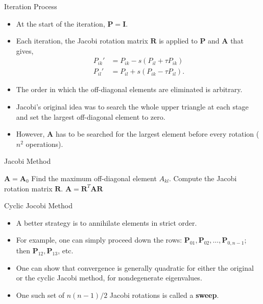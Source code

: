\documentclass{beamer}
\begin{document}
\begin{frame}{Iteration Process}
    \begin{itemize}
        \item At the start of the iteration, $\mathbf{P}=\mathbf{I}$. 
        \item Each iteration, the Jacobi rotation matrix $\mathbf{R}$ is applied to $\mathbf{P}$ and $\mathbf{A}$  that gives,
        \begin{align*}
            P_{i k}' & =P_{i k}-s\left(P_{i l}+\tau P_{i k}\right) \\
            P_{i l}' & =P_{i l}+s\left(P_{i k}-\tau P_{i l}\right).
        \end{align*}
        \item The order in which the off-diagonal elements are eliminated is arbitrary.
        \item Jacobi's original idea was to search the whole upper triangle at each stage and
         set the largest off-diagonal element to zero. 
        \item However, $\mathbf{A}$ has to be searched for the largest element before every rotation ($n^2$ operations).
    \end{itemize}
\end{frame}

\begin{frame}{Jacobi Method}
    \begin{algorithm}[H]
        \caption{Jacobi Method}
        \begin{algorithmic}
            \State $\mathbf{A}=\mathbf{A}_0$
            \State Find the maximum off-diagonal element $A_{k l}$.
            \State Compute the Jacobi rotation matrix $\mathbf{R}$.
            \State $\mathbf{A}=\mathbf{R}^T \mathbf{A} \mathbf{R}$
            \EndWhile
        \end{algorithmic}
    \end{algorithm}
\end{frame}

\begin{frame}{Cyclic Jocobi Method}
    \begin{itemize}
        \item A better strategy is to annihilate elements in strict order.
        \item  For example, one can simply proceed down the rows: $\mathbf{P}_{01}, \mathbf{P}_{02}, \ldots, \mathbf{P}_{0, n-1}$; then $\mathbf{P}_{12}, \mathbf{P}_{13}$, etc.
        \item  One can show that convergence is generally quadratic for either the original or the cyclic Jacobi method, for nondegenerate eigenvalues. 
        \item One such set of $n(n-1) / 2$ Jacobi rotations is called a \textbf{sweep}.
    \end{itemize}
\end{frame}
\end{document}
